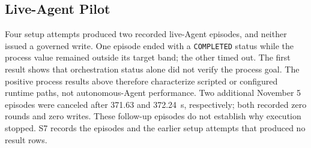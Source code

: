 \subsection{Live-Agent Pilot}
\label{sec:eval-agent}
Four setup attempts produced two recorded live-Agent episodes, and neither issued a governed write. One episode ended with a \texttt{COMPLETED} status while the process value remained outside its target band; the other timed out. The first result shows that orchestration status alone did not verify the process goal. The positive process results above therefore characterize scripted or configured runtime paths, not autonomous-Agent performance. Two additional November 5 episodes were canceled after 371.63 and 372.24~s, respectively; both recorded zero rounds and zero writes. These follow-up episodes do not establish why execution stopped. S7 records the episodes and the earlier setup attempts that produced no result rows.
